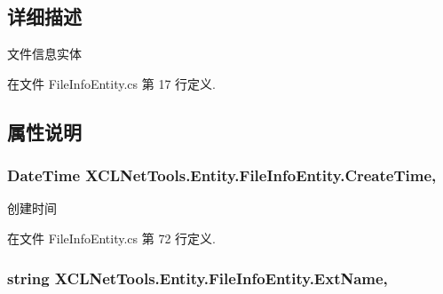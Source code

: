 \subsection{详细描述}
文件信息实体 



在文件 File\+Info\+Entity.\+cs 第 17 行定义.



\subsection{属性说明}
\subsubsection[{\texorpdfstring{Create\+Time}{CreateTime}}]{\setlength{\rightskip}{0pt plus 5cm}Date\+Time X\+C\+L\+Net\+Tools.\+Entity.\+File\+Info\+Entity.\+Create\+Time\hspace{0.3cm}{\ttfamily [get]}, {\ttfamily [set]}}\hypertarget{class_x_c_l_net_tools_1_1_entity_1_1_file_info_entity_a93fc7b2a3119885d9449d1817e7306ca}{}\label{class_x_c_l_net_tools_1_1_entity_1_1_file_info_entity_a93fc7b2a3119885d9449d1817e7306ca}


创建时间 



在文件 File\+Info\+Entity.\+cs 第 72 行定义.

\subsubsection[{\texorpdfstring{Ext\+Name}{ExtName}}]{\setlength{\rightskip}{0pt plus 5cm}string X\+C\+L\+Net\+Tools.\+Entity.\+File\+Info\+Entity.\+Ext\+Name\hspace{0.3cm}{\ttfamily [get]}, {\ttfamily [set]}}\hypertarget{class_x_c_l_net_tools_1_1_entity_1_1_file_info_entity_a46ccaf5dbcc1154782c0227c83eb54e4}{}\label{class_x_c_l_net_tools_1_1_entity_1_1_file_info_entity_a46ccaf5dbcc1154782c0227c83eb54e4}


